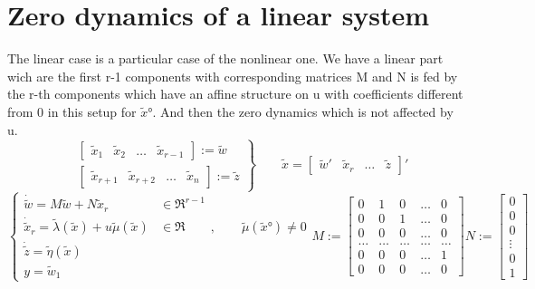 \section{Zero dynamics of a linear system}
The linear case is a particular case of the nonlinear one. We have a linear part wich are the first r-1 components with corresponding matrices M and N is fed by the r-th components which have an affine structure on u with coefficients different from 0 in this setup for $\tilde{x}°$. And then the zero dynamics which is not affected by u.
\[
\left.
\begin{aligned}
	& \begin{bmatrix} \tilde{x}_1 & \tilde{x}_2 & \dots & \tilde{x}_{r-1}\end{bmatrix} := \tilde{w}\\
	&  \begin{bmatrix} \tilde{x}_{r+1} & \tilde{x}_{r+2} & \dots & \tilde{x}_n\end{bmatrix}:=\tilde{z}
\end{aligned}
\right\rbrace\qquad 	\tilde{x}=  \begin{bmatrix} \tilde{w}' & \tilde{x}_r & \dots & \tilde{z}\end{bmatrix}'
\] 
\begin{equation*}
	\left\{
	\begin{array}{ll}	
		\dot{\tilde{w}}=M\tilde{w}+N\tilde{x}_r & \in \Re^{r-1}\\
		\dot{\tilde{x}}_r=\tilde{\lambda}(\tilde{x})+u\tilde{\mu}(\tilde{x}) & \in \Re \qquad,\qquad \tilde{\mu}(\tilde{x}°)\neq 0\\
		\dot{\tilde{z}}=\tilde{\eta}(\tilde{x})\\
		y=\tilde{w}_1 &
	\end{array}
	\right.	 M:=\begin{bmatrix}
		0 & 1 & 0 & \dots & 0 \\
		0 & 0 & 1 & \dots & 0 \\
		0 & 0 & 0 & \dots & 0 \\
		\dots & \dots & \dots & \dots & \dots \\
		0 & 0 & 0 & \dots & 1 \\
		0 & 0 & 0 & \dots & 0
	\end{bmatrix}
N:=\begin{bmatrix}
0 \\
0 \\
0 \\
\vdots \\
0 \\
1
\end{bmatrix}
\end{equation*}
